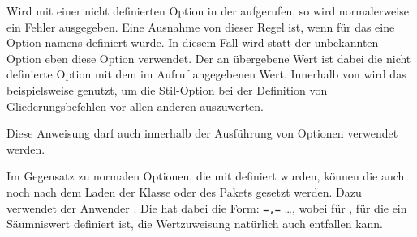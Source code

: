 Wird  mit
einer nicht definierten Option in der  aufgerufen, so
wird normalerweise ein Fehler ausgegeben. Eine Ausnahme von dieser Regel ist,
wenn für das  eine Option namens
 definiert wurde. In diesem Fall
wird statt der unbekannten Option eben diese Option 
verwendet. Der an  übergebene Wert ist dabei die nicht
definierte Option mit dem im Aufruf angegebenen Wert.  Innerhalb von
\KOMAScript{} wird das beispielsweise genutzt, um die Stil-Option bei der
Definition von Gliederungsbefehlen vor allen anderen auszuwerten.

Diese Anweisung darf auch innerhalb der Ausführung von Optionen verwendet
werden.%
%
\EndIndexGroup


\begin{Declaration}
\end{Declaration}
Im Gegensatz zu normalen Optionen, die mit  definiert
wurden, können die  auch noch nach dem Laden der Klasse oder
des Pakets gesetzt werden. Dazu verwendet der Anwender
. Die  hat dabei die Form:
    \texttt{=}\texttt{,}\linebreak[1]%
    \texttt{=} \dots{},
wobei für , für die ein Säumniswert definiert ist, die
Wertzuweisung natürlich auch entfallen kann.

